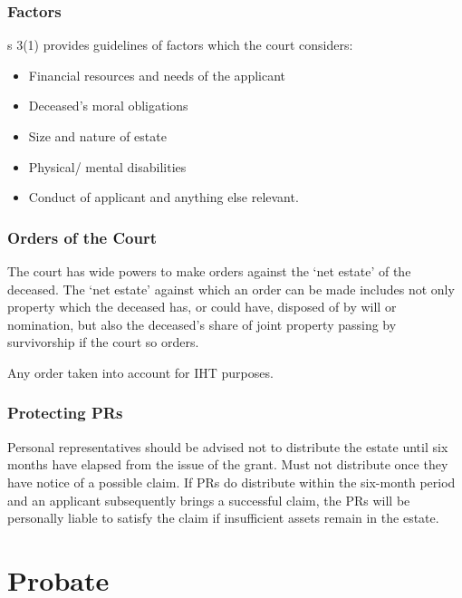 \documentclass[
]{article}
\providecommand{\tightlist}{%
  \setlength{\itemsep}{0pt}\setlength{\parskip}{0pt}}
\begin{document}
\hypertarget{factors}{%
\subsubsection{Factors}\label{factors}}

s 3(1) provides guidelines of factors which the court considers:

\begin{itemize}
\tightlist
\item
  Financial resources and needs of the applicant
\item
  Deceased's moral obligations
\item
  Size and nature of estate
\item
  Physical/ mental disabilities
\item
  Conduct of applicant and anything else relevant.
\end{itemize}

\hypertarget{orders-of-the-court}{%
\subsubsection{Orders of the Court}\label{orders-of-the-court}}

The court has wide powers to make orders against the `net estate' of the
deceased. The `net estate' against which an order can be made includes
not only property which the deceased has, or could have, disposed of by
will or nomination, but also the deceased's share of joint property
passing by survivorship if the court so orders.

Any order taken into account for IHT purposes.

\hypertarget{protecting-prs}{%
\subsubsection{Protecting PRs}\label{protecting-prs}}

Personal representatives should be advised not to distribute the estate
until six months have elapsed from the issue of the grant. Must not
distribute once they have notice of a possible claim. If PRs do
distribute within the six-month period and an applicant subsequently
brings a successful claim, the PRs will be personally liable to satisfy
the claim if insufficient assets remain in the estate.

\hypertarget{probate}{%
\section{Probate}\label{probate}}
\end{document}
